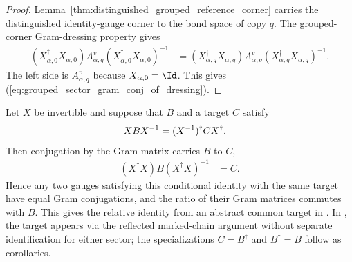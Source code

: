 \begin{proof}\leanok
    Lemma~\ref{thm:distinguished_grouped_reference_corner} carries the
    distinguished identity-gauge corner to the bond space of copy $q$. The
    grouped-corner Gram-dressing property gives
    \begin{align}
        (X_{\alpha,0}^\dagger X_{\alpha,0})A_{\alpha,q}^v
        (X_{\alpha,0}^\dagger X_{\alpha,0})^{-1}
         & =(X_{\alpha,q}^\dagger X_{\alpha,q})A_{\alpha,q}^v
        (X_{\alpha,q}^\dagger X_{\alpha,q})^{-1}.
    \end{align}
    The left side is $A_{\alpha,q}^v$ because $X_{\alpha,0}=\Id$. This gives
    (\ref{eq:grouped_sector_gram_conj_of_dressing}).
\end{proof}

\begin{lemma}
    \label{thm:gram_conj_of_dressed_adjoint}
    \leanok
    Let $X$ be invertible and suppose that $B$ and a target $C$ satisfy
    \begin{align}
        XBX^{-1}
         & =(X^{-1})^\dagger C X^\dagger.
        \notag
    \end{align}
    Then conjugation by the Gram matrix carries $B$ to $C$,
    \begin{align}
        (X^\dagger X)B(X^\dagger X)^{-1}
         & =C.
        \label{eq:mpdo_gram_target}
    \end{align}
    Hence any two gauges satisfying this conditional identity with the same
    target have equal Gram conjugations, and the ratio of their Gram matrices
    commutes with $B$. This gives the relative identity from an abstract common
    target in
    \cite[Proposition~4.13, lines 1909--1919]{Cirac2016MPDO_arXiv}.
    In \cite[Proposition~4.13, lines~1909--1919]{Cirac2016MPDO_arXiv}, the
    target appears via the reflected marked-chain argument without separate
    identification for either sector; the specializations $C=B^\dagger$ and
    $B^\dagger=B$ follow as corollaries.
\end{lemma}

